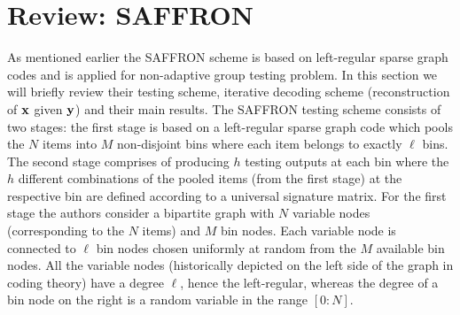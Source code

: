 %

\section{Review: SAFFRON}
\label{Sec:PriorWork}
As mentioned earlier the SAFFRON scheme \cite{lee2015saffron} is based on left-regular sparse graph codes and is applied for non-adaptive group testing problem. In this section we will briefly review their testing scheme, iterative decoding scheme (reconstruction of $\mathbf{x}$ given $\mathbf{y}$) and their main results. The SAFFRON testing scheme consists of two stages: the first stage is based on a left-regular sparse graph code which pools the $N$ items into $M$ non-disjoint bins where each item belongs to exactly $\ell$ bins. The second stage comprises of producing $h$ testing outputs at each bin where the $h$ different combinations of the pooled items (from the first stage) at the respective bin are defined according to a universal signature matrix. For the first stage the authors consider a bipartite graph with $N$ variable nodes (corresponding to the $N$ items) and $M$ bin nodes. Each variable node is connected to $\ell$ bin nodes chosen uniformly at random from the $M$ available bin nodes. All the variable nodes (historically depicted on the left side of the graph in coding theory) have a degree $\ell$, hence the left-regular, whereas the degree of a bin node on the right is a random variable in the range $[0:N]$.

